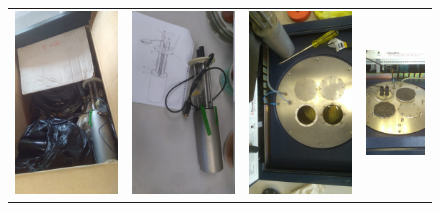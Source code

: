 \documentclass[a0]{sciposter}
\begin{document}
\begin{multicols}{3}
	\begin{figure}
		\centering
		\begin{tabular}{cccc}
			\includegraphics[width=0.24\linewidth]{../Tesis/Figures/process/box1} & 
			\includegraphics[width=0.24\linewidth]{../Tesis/Figures/process/holder} &
			\includegraphics[width=0.24\linewidth]{../Tesis/Figures/process/p1} & 
			\includegraphics[width=0.24\linewidth]{../Tesis/Figures/process/p2} \\ 

\end{tabular}
\end{figure}
\end{multicols}
\end{document}
